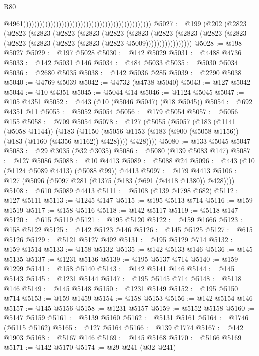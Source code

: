 \begin{lexlean}{R80}
\begin{coremodule}
                                                                                                  @4961)))))))))))))))))))))))))))))))))))))))))))))))
@5027 := @199
    (@202
      (@2823
        (@2823
          (@2823
            (@2823
              (@2823
                (@2823
                  (@2823
                    (@2823
                      (@2823 (@2823 (@2823 (@2823 (@2823 (@2823 (@2823 (@2823 @5009)))))))))))))))))
@5028 := @198 @5027
@5029 := @197 @5028
@5030 := @142 @5029
@5031 := @4488 @4736
@5033 := @142 @5031 @146
@5034 := @484 @5033
@5035 := @5030 @5034
@5036 := @2680 @5035
@5038 := @142 @5036 @285
@5039 := @2290 @5038
@5040 := @4769 @5039
@5042 := @4732 (@4738 @5040)
@5043 := @127 @5042
@5044 := @10 @4351
@5045 := @5044 @14
@5046 := @1124 @5045
@5047 := @105 @4351
@5052 := @443 (@10 (@5046 @5047) (@18 @5045))
@5054 := @692 @4351 @11
@5055 := @5052 @5054
@5056 := @179 @5054
@5057 := @5056 @155
@5058 := @709 @5054
@5078 := @127
    (@5055
      (@5057
        (@183
          (@1141 (@5058 @1144))
          (@183
            (@1150 (@5056 @1153 (@183 (@900 (@5058 @1156)) (@183 (@1160 (@4356 @1162)) @428))))
            @428))))
@5080 := @133 @5045 @5047
@5083 := @29 @3035 (@32 @3035)
@5086 := @5080 (@139 @5083 @147)
@5087 := @127 @5086
@5088 := @10 @4413
@5089 := @5088 @24
@5096 := @443 (@10 (@1124 @5089 @4413) (@5088 @99)) @4413
@5097 := @179 @4413
@5106 := @127 (@5096 (@5097 @281 (@1375 (@183 (@691 (@4418 @1380)) @428))))
@5108 := @610 @5089 @4413
@5111 := @5108 (@139 @1798 @682)
@5112 := @127 @5111
@5113 := @1245 @147
@5115 := @195 @5113 @714
@5116 := @159 @1519
@5117 := @158 @5116
@5118 := @142 @5117
@5119 := @5118 @147
@5120 := @615 @5119
@5121 := @195 @5120
@5122 := @159 @1666
@5123 := @158 @5122
@5125 := @142 @5123 @146
@5126 := @145 @5125
@5127 := @615 @5126
@5129 := @5121 @5127 @492
@5131 := @195 @5129 @714
@5132 := @159 @1514
@5133 := @158 @5132
@5135 := @142 @5133 @146
@5136 := @145 @5135
@5137 := @1231 @5136
@5139 := @195 @5137 @714
@5140 := @159 @1299
@5141 := @158 @5140
@5143 := @142 @5141 @146
@5144 := @145 @5143
@5145 := @1231 @5144
@5147 := @195 @5145 @714
@5148 := @5118 @146
@5149 := @145 @5148
@5150 := @1231 @5149
@5152 := @195 @5150 @714
@5153 := @159 @1459
@5154 := @158 @5153
@5156 := @142 @5154 @146
@5157 := @145 @5156
@5158 := @1231 @5157
@5159 := @5152 @5158
@5160 := @5147 @5159
@5161 := @5139 @5160
@5162 := @5131 @5161
@5164 := @1746 (@5115 @5162)
@5165 := @127 @5164
@5166 := @139 @1774
@5167 := @142 @1903
@5168 := @5167 @146
@5169 := @145 @5168
@5170 := @5166 @5169
@5171 := @142 @5170
@5174 := @29 @241 (@32 @241)

\end{coremodule}
\end{lexlean}
